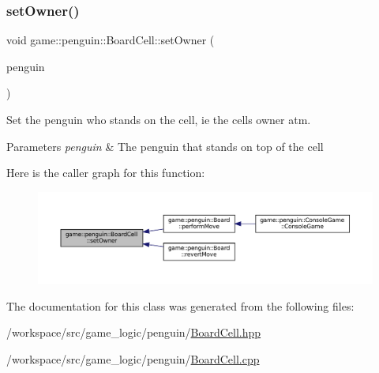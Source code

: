\subsubsection{\texorpdfstring{set\+Owner()}{setOwner()}}
{\footnotesize\ttfamily void game\+::penguin\+::\+Board\+Cell\+::set\+Owner (\begin{DoxyParamCaption}\item[{\hyperlink{classgame_1_1penguin_1_1_penguin_pawn}{Penguin\+Pawn} $\ast$}]{penguin }\end{DoxyParamCaption})\hspace{0.3cm}{\ttfamily [inline]}}



Set the penguin who stands on the cell, ie the cell\textquotesingle{}s owner atm. 


\begin{DoxyParams}{Parameters}
{\em penguin} & The penguin that stands on top of the cell \\
\hline
\end{DoxyParams}
Here is the caller graph for this function\+:
\nopagebreak
\begin{figure}[H]
\begin{center}
\leavevmode
\includegraphics[width=350pt]{classgame_1_1penguin_1_1_board_cell_a5d3fd7b5a5e170bd6fbc101f5240f4b1_icgraph}
\end{center}
\end{figure}


The documentation for this class was generated from the following files\+:\begin{DoxyCompactItemize}
\item 
/workspace/src/game\+\_\+logic/penguin/\hyperlink{penguin_2_board_cell_8hpp}{Board\+Cell.\+hpp}\item 
/workspace/src/game\+\_\+logic/penguin/\hyperlink{penguin_2_board_cell_8cpp}{Board\+Cell.\+cpp}\end{DoxyCompactItemize}
